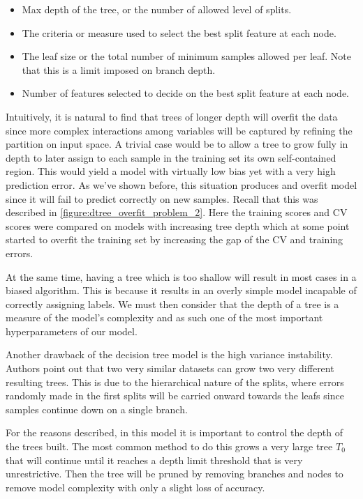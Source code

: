 \begin{itemize}
\item Max depth of the tree, or the number of allowed level of splits.
\item The criteria or measure used to select the best split feature at each node.
\item The leaf size or the total number of minimum samples allowed per leaf. Note that this is a limit imposed on branch depth.
\item Number of features selected to decide on the best split feature at each node.
\end{itemize}


Intuitively, it is natural to find that trees of longer depth will overfit the data since more complex interactions among variables will be captured by refining the partition on input space.
A trivial case would be to allow a tree to grow fully in depth to later assign to each sample in the training set its own self-contained region.
This would yield a model with virtually low bias yet with a very high prediction error.
As we've shown before, this situation produces and overfit model since it will fail to predict correctly on new samples.
Recall that this was described in \cref{figure:dtree_overfit_problem_2}.
Here the training scores and CV scores were compared on models with increasing tree depth which at some point started to overfit the training set by increasing the gap of the CV and training errors.

At the same time, having a tree which is too shallow will result in most cases in a biased algorithm.
This is because it results in an overly simple model incapable of correctly assigning labels.
We must then consider that the depth of a tree is a measure of the model's complexity and as such one of the most important hyperparameters of our model.

Another drawback of the decision tree model is the high variance instability.
Authors point out that two very similar datasets can grow two very different resulting trees.
This is due to the hierarchical nature of the splits, where errors randomly made in the first splits will be carried onward towards the leafs since samples continue down on a single branch.

For the reasons described, in this model it is important to control the depth of the trees built.
The most common method to do this grows a very large tree $T_0$ that will continue until it reaches a depth limit threshold that is very unrestrictive.
Then the tree will be pruned by removing branches and nodes to remove model complexity with only a slight loss of accuracy.

